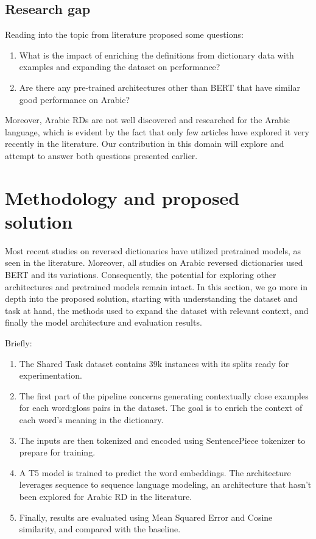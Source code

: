 \documentclass[15pt]{article}
\begin{document}
\subsection{Research gap}

Reading into the topic from literature proposed some questions:
\begin{enumerate}
    \item What is the impact of enriching the definitions from dictionary data with examples and expanding the dataset on performance?
    \item Are there any pre-trained architectures other than BERT that have similar good performance on Arabic?
\end{enumerate}

Moreover, Arabic RDs are not well discovered and researched for the Arabic language, which is evident by the fact that only few articles have explored it very recently in the literature. Our contribution in this domain will explore and attempt to answer both questions presented earlier.

\section{Methodology and proposed solution}

Most recent studies on reversed dictionaries have utilized pretrained models, as seen in the literature. Moreover, all studies on Arabic reversed dictionaries used BERT and its variations. Consequently, the potential for exploring other architectures and pretrained models remain intact. 
In this section, we go more in depth into the proposed solution, starting with understanding the dataset and task at hand, the methods used to expand the dataset with relevant context, and finally the model architecture and evaluation results.

Briefly:
\begin{enumerate}
    \item The Shared Task dataset contains 39k instances with its splits ready for experimentation.
    \item The first part of the pipeline concerns generating contextually close examples for each word:gloss pairs in the dataset. The goal is to enrich the context of each word's meaning in the dictionary.
    \item The inputs are then tokenized and encoded using SentencePiece tokenizer to prepare for training.
    \item A T5 model is trained to predict the word embeddings. The architecture leverages sequence to sequence language modeling, an architecture that hasn’t been explored for Arabic RD in the literature.
    \item Finally, results are evaluated using Mean Squared Error and Cosine similarity, and compared with the baseline.
\end{enumerate}
\end{document}
